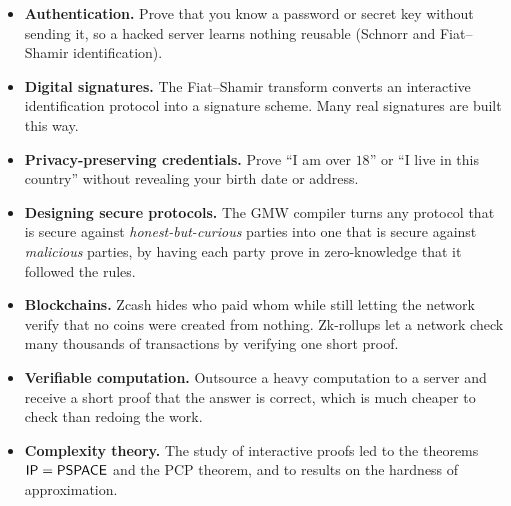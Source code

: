 \documentclass[11pt,a4paper]{report}
\theoremstyle{plain}
\theoremstyle{definition}
\theoremstyle{remark}
\newcommand{\PSPACE}{\mathsf{PSPACE}}\newcommand{\AM}{\mathsf{AM}}\newcommand{\coAM}{\mathsf{coAM}}
\begin{document}
\begin{itemize}
\item \textbf{Authentication.} Prove that you know a password or secret key without sending it, so a hacked server learns nothing reusable (Schnorr and Fiat--Shamir identification).
\item \textbf{Digital signatures.} The Fiat--Shamir transform converts an interactive identification protocol into a signature scheme. Many real signatures are built this way.
\item \textbf{Privacy-preserving credentials.} Prove ``I am over $18$'' or ``I live in this country'' without revealing your birth date or address.
\item \textbf{Designing secure protocols.} The GMW compiler turns any protocol that is secure against \emph{honest-but-curious} parties into one that is secure against \emph{malicious} parties, by having each party prove in zero-knowledge that it followed the rules.
\item \textbf{Blockchains.} Zcash hides who paid whom while still letting the network verify that no coins were created from nothing. Zk-rollups let a network check many thousands of transactions by verifying one short proof.
\item \textbf{Verifiable computation.} Outsource a heavy computation to a server and receive a short proof that the answer is correct, which is much cheaper to check than redoing the work.
\item \textbf{Complexity theory.} The study of interactive proofs led to the theorems $\IP=\PSPACE$ and the PCP theorem, and to results on the hardness of approximation.
\end{itemize}

\end{document}

